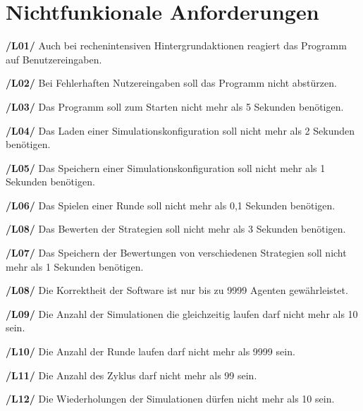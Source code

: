 \section{Nichtfunkionale Anforderungen}

\textbf{/L01/ }
Auch bei rechenintensiven Hintergrundaktionen reagiert das Programm auf Benutzereingaben.

\textbf{/L02/}
Bei Fehlerhaften Nutzereingaben soll das Programm nicht abstürzen.

\textbf{/L03/}
Das Programm soll zum Starten nicht mehr als 5 Sekunden benötigen.

\textbf{/L04/}
Das Laden einer Simulationskonfiguration soll nicht mehr als 2 Sekunden benötigen.

\textbf{/L05/}
Das Speichern einer Simulationskonfiguration soll nicht mehr als 1 Sekunden benötigen.

\textbf{/L06/}
Das Spielen einer Runde soll nicht mehr als 0,1 Sekunden benötigen.

\textbf{/L08/}
Das Bewerten der Strategien soll nicht mehr als 3 Sekunden benötigen.

\textbf{/L07/}
Das Speichern der Bewertungen von verschiedenen Strategien soll nicht mehr als 1 Sekunden benötigen.

\textbf{/L08/}
Die Korrektheit der Software ist nur bis zu 9999 Agenten gewährleistet.

\textbf{/L09/}
Die Anzahl der Simulationen die gleichzeitig laufen darf nicht mehr als 10 sein.

\textbf{/L10/}
Die Anzahl der Runde laufen darf nicht mehr als 9999 sein.

\textbf{/L11/}
Die Anzahl des Zyklus darf nicht mehr als 99 sein.

\textbf{/L12/}
Die Wiederholungen der Simulationen dürfen nicht mehr als 10 sein.